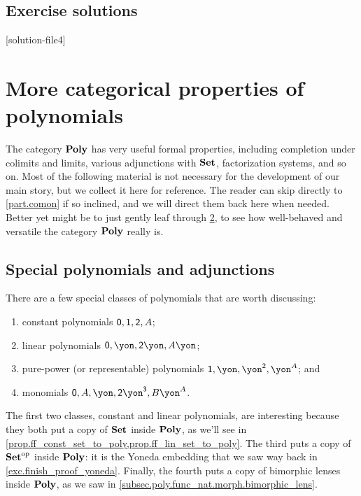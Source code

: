 \documentclass[Book-Poly]{subfiles}
\begin{document}
\section{Exercise solutions}
{\footnotesize
}

[solution-file4]

\chapter{More categorical properties of polynomials} \label{sec.bonus_poly}

The category $\mathbf{Poly}$ has very useful formal properties, including completion under colimits and limits, various adjunctions with $\mathbf{Set}$, factorization systems, and so on. Most of the following material is not necessary for the development of our main story, but we collect it here for reference. The reader can skip directly to \cref{part.comon} if so inclined, and we will direct them back here when needed. Better yet might be to just gently leaf through \cref{sec.bonus_poly}, to see how well-behaved and versatile the category $\mathbf{Poly}$ really is.

\section{Special polynomials and adjunctions}

There are a few special classes of polynomials that are worth discussing: 
\begin{enumerate}[label=\alph*)]
	\item constant polynomials $\textsf{0},\textsf{1},\textsf{2},A$; 
	\item linear polynomials $\0,\yon, \2\yon, A\yon$;
	\item pure-power (or representable) polynomials $\1, \yon, \yon^\2, \yon^A$; and 
	\item monomials $\0, A, \yon, \2\yon^\3, B\yon^A$.
\end{enumerate}
The first two classes, constant and linear polynomials, are interesting because they both put a copy of $\mathbf{Set}$ inside $\mathbf{Poly}$, as we'll see in \cref{prop.ff_const_set_to_poly,prop.ff_lin_set_to_poly}. 
The third puts a copy of $\mathbf{Set}^{\textnormal{op}}$ inside $\mathbf{Poly}$: it is the Yoneda embedding that we saw way back in \cref{exc.finish_proof_yoneda}.
Finally, the fourth puts a copy of bimorphic lenses inside $\mathbf{Poly}$, as we saw in \cref{subsec.poly.func_nat.morph.bimorphic_lens}.
\end{document}
